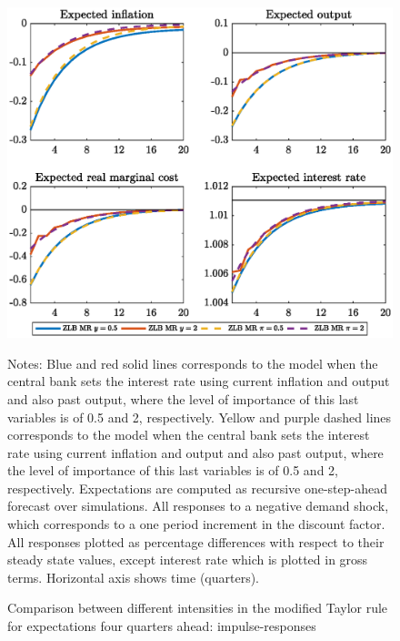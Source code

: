 \documentclass[11pt]{article}
\numberwithin{equation}{section}
\begin{document}
\begin{figure}[H]
	\centering
	\caption{Comparison between different intensities in the modified Taylor rule for expectations four quarters ahead: impulse-responses}\label{fig:irfCompDegreeExp4_pref}
	\includegraphics[scale=.6]{irfCompDegreeExp4_pref}
	\begin{minipage}{\linewidth}
    	\vspace{1mm}
	\footnotesize{{\sc Notes:} Blue and red solid lines corresponds to the model when the central bank sets the interest rate using current inflation and output and also past output, where the level of importance of this last variables is of 0.5 and 2, respectively. Yellow and purple dashed lines corresponds to the model when the central bank sets the interest rate using current inflation and output and also past output, where the level of importance of this last variables is of 0.5 and 2, respectively. Expectations are computed as recursive one-step-ahead forecast over simulations. All responses to a negative demand shock, which corresponds to a one period increment in the discount factor. All responses plotted as percentage differences with respect to their steady state values, except interest rate which is plotted in gross terms. Horizontal axis shows time (quarters).}
	\end{minipage}
\end{figure}
\end{document}
